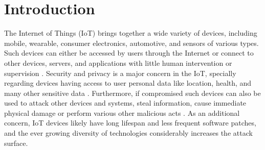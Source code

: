 

\section{Introduction}

\newcommand{\refminas}{\textit{Ref}\xspace}
\newcommand{\mfog}{\textit{MFOG}\xspace}
\newcommand{\iot}{IoT\xspace}
\newcommand{\nids}{NIDS\xspace}
\newcommand{\ds}{DS\xspace}
\newcommand{\minas}{MINAS\xspace}


The Internet of Things (\iot) brings together a wide variety of devices,
including mobile, wearable, consumer electronics, automotive, and sensors of
various types.
% 
Such devices can either be accessed by users through the Internet or connect
to other devices, servers, and applications
with little human intervention or supervision
\cite{Tahsien2020,abane2019,haddadpajouh2019survey,Shanbhag2015}.
% 
Security and privacy is a major concern in the IoT, specially regarding
devices having access to user personal data like
location, health, and many other sensitive data \cite{sengupta2020comprehensive}.
% 
Furthermore, if compromised such devices can also be used to attack other
devices and systems, steal information, cause immediate physical damage or
perform various other malicious acts \cite{Kolias2017mirai}.
% 
As an additional concern, IoT devices likely have long lifespan and less frequent
software patches, and the ever growing diversity of 
technologies considerably increases the attack surface.


